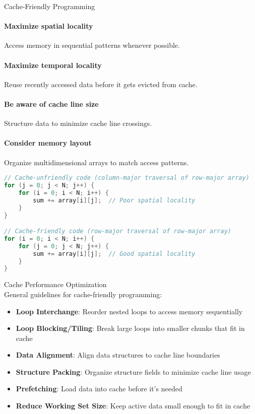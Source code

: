 \begin{KR}{Cache-Friendly Programming}\\
\paragraph{Maximize spatial locality}
Access memory in sequential patterns whenever possible.
\paragraph{Maximize temporal locality}
Reuse recently accessed data before it gets evicted from cache.
\paragraph{Be aware of cache line size}
Structure data to minimize cache line crossings.
\paragraph{Consider memory layout}
Organize multidimensional arrays to match access patterns.

\begin{lstlisting}[language=C, style=basesmol]
// Cache-unfriendly code (column-major traversal of row-major array)
for (j = 0; j < N; j++) {
    for (i = 0; i < N; i++) {
        sum += array[i][j];  // Poor spatial locality
    }
}

// Cache-friendly code (row-major traversal of row-major array)
for (i = 0; i < N; i++) {
    for (j = 0; j < N; j++) {
        sum += array[i][j];  // Good spatial locality
    }
}
\end{lstlisting}
\end{KR}

\begin{concept}{Cache Performance Optimization}\\
General guidelines for cache-friendly programming:
\begin{itemize}
    \item \textbf{Loop Interchange}: Reorder nested loops to access memory sequentially
    \item \textbf{Loop Blocking/Tiling}: Break large loops into smaller chunks that fit in cache
    \item \textbf{Data Alignment}: Align data structures to cache line boundaries
    \item \textbf{Structure Packing}: Organize structure fields to minimize cache line usage
    \item \textbf{Prefetching}: Load data into cache before it's needed
    \item \textbf{Reduce Working Set Size}: Keep active data small enough to fit in cache
\end{itemize}
\end{concept}


